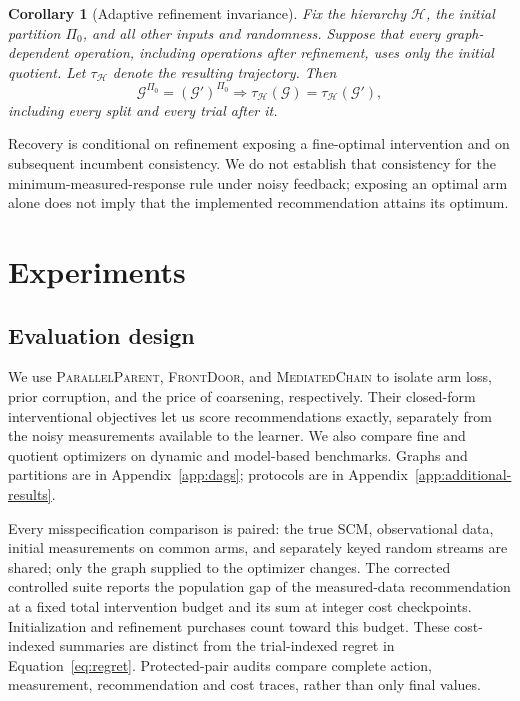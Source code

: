 \documentclass[twoside]{article}
\newtheorem{corollary}{Corollary}
\newcommand{\Gg}{\mathcal{G}}
\begin{document}
\begin{corollary}[Adaptive refinement invariance]
\label{cor:adaptive-invariance}
Fix the hierarchy $\mathcal H$, the initial partition $\Pi_0$, and all other inputs and randomness. Suppose that every graph-dependent operation, including operations after refinement, uses only the initial quotient. Let $\tau_{\mathcal H}$ denote the resulting trajectory. Then
\[
 \Gg^{\Pi_0}=(\Gg')^{\Pi_0}
 \Longrightarrow
 \tau_{\mathcal H}(\Gg)=\tau_{\mathcal H}(\Gg'),
\]
including every split and every trial after it.
\end{corollary}

Recovery is conditional on refinement exposing a fine-optimal
intervention and on subsequent incumbent consistency. We do not establish that consistency for the minimum-measured-response rule under noisy feedback; exposing an optimal arm alone does not imply that the implemented recommendation attains its optimum.

\section{Experiments}
\label{sec:experiments}

\subsection{Evaluation design}
\label{sec:exp-design}

We use \textsc{ParallelParent}, \textsc{FrontDoor}, and \textsc{MediatedChain} to isolate arm loss, prior corruption, and the price of coarsening, respectively. Their closed-form interventional objectives let us score recommendations exactly, separately from the noisy measurements available to the learner. We also compare fine and quotient optimizers on dynamic and model-based benchmarks. Graphs and partitions are in Appendix~\ref{app:dags}; protocols are in Appendix~\ref{app:additional-results}.

Every misspecification comparison is paired: the true SCM, observational data, initial measurements on common arms, and separately keyed random streams are shared; only the graph supplied to the optimizer changes. The corrected controlled suite reports the population gap of the measured-data recommendation at a fixed total intervention budget and its sum at integer cost checkpoints. Initialization and refinement purchases count toward this budget. These cost-indexed summaries are distinct from the trial-indexed regret in Equation~\eqref{eq:regret}. Protected-pair audits compare complete action, measurement, recommendation and cost traces, rather than only final values.
\end{document}
